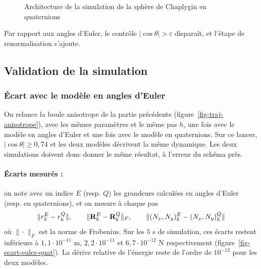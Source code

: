\begin{figure}[H]
    \caption{Architecture de la simulation de la sphère de Chaplygin
    en quaternions}
\end{figure}

Par rapport aux angles d'Euler, le contrôle $|\cos\theta| > \varepsilon$
disparaît, et l'étape de renormalisation s'ajoute.

\subsection{Validation de la simulation}
\subsubsection{Écart avec le modèle en angles d'Euler}

On relance la boule anisotrope de la partie précédente
(figure~\ref{fig-traj-anisotrope}), avec les mêmes paramètres et le même
pas $h$, une fois avec le modèle en angles d'Euler et une fois avec le
modèle en quaternions. Sur ce lancer, $|\cos\theta| \geq 0{,}74$ et les deux modèles décrivent la même
dynamique. Les deux simulations doivent donc donner le même résultat, à l'erreur du schéma près.
\paragraph{Écarts mesurés : } on note avec un indice $E$ (resp. $Q$) les
grandeurs calculées en angles d'Euler (resp. en quaternions), et on
mesure à chaque pas
\[
    \|r_k^E - r_k^Q\|,
    \qquad
    \|\mathbf{R}_k^E - \mathbf{R}_k^Q\|_F,
    \qquad
    \|(N_x, N_y)_k^E - (N_x, N_y)_k^Q\|
\]
où $\|\cdot\|_F$ est la norme de Frobenius. Sur les $5$ s de simulation,
ces écarts restent inférieurs à $1{,}1\cdot 10^{-11}$ m,
$2{,}2\cdot 10^{-11}$ et $6{,}7\cdot 10^{-12}$ N respectivement
(figure~\ref{fig-ecart-euler-quat}). La dérive relative de l'énergie
reste de l'ordre de $10^{-12}$ pour les deux modèles.

